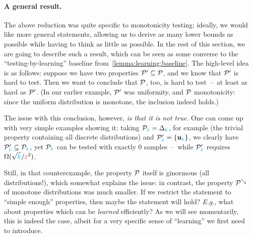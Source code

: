 \paragraph{A general result.} The above reduction was quite specific to monotonicity testing: ideally, we would like more general statements, allowing us to derive as many lower bounds as possible while having to think as little as possible. In the rest of this section, we are going to describe such a result, which can be seen as some converse to the ``testing-by-learning'' baseline from~\cref{lemma:learning:baseline}. The high-level idea is as follows: suppose we have two properties $\mathcal{P}' \subseteq \mathcal{P}$, and we know that $\mathcal{P}'$ is hard to test. Then we want to conclude that $\mathcal{P}$, too, is hard to test~--~at least as hard as $\mathcal{P}'$. (In our earlier example, $\mathcal{P}'$ was uniformity, and $\mathcal{P}$ monotonicity: since the uniform distribution is monotone, the inclusion indeed holds.)

The issue with this conclusion, however, \emph{is that it is not true.} One can come up with very simple examples showing it: taking $\mathcal{P}_{\textcolor{cyan}{k}} = \Delta_{{\textcolor{cyan}{k}}}$, for example (the trivial property containing all discrete distributions) and $\mathcal{P}'_{\textcolor{cyan}{k}}=\{\mathbf{u}_{\textcolor{cyan}{k}}\}$, we clearly have $\mathcal{P}'_{\textcolor{cyan}{k}} \subseteq \mathcal{P}_{\textcolor{cyan}{k}}$, yet $\mathcal{P}_{\textcolor{cyan}{k}}$ can be tested with exactly 0 samples~--~while $\mathcal{P}'_{\textcolor{cyan}{k}}$ requires $\Omega(\sqrt{{\textcolor{cyan}{k}}}/\textcolor{red}{\varepsilon}^2)$.

Still, in that counterexample, the property $\mathcal{P}$ itself is ginormous (all distributions!), which somewhat explains the issue: in contrast, the property $\mathcal{P}^{\searrow}$ of monotone distributions was much smaller. If we restrict the statement to ``simple enough'' properties, then maybe the statement will hold? \textit{E.g.}, what about properties which can be \emph{learned} efficiently?  
As we will see momentarily, this is indeed the case, albeit for a very specific sense of ``learning'' we first need to introduce.

